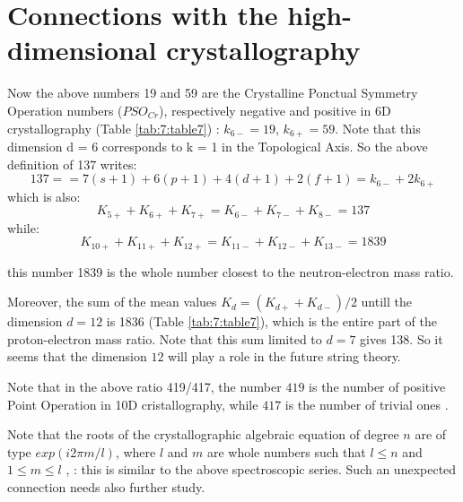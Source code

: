 \documentclass[a4paper,9pt]{article}
\begin{document}
 
 
 
 
 
 
 
 
 \section{Connections with the high-dimensional crystallography}
 
 Now the above numbers 19 and 59 are the Crystalline Ponctual Symmetry Operation numbers ($PSO_{Cr}$), respectively negative and positive in 6D crystallography \cite{Weigel} (Table \ref{tab:7:table7}) : $k_{6-} = 19$, $k_{6+} = 59$. Note that this dimension d = 6 corresponds to k = 1 in the Topological Axis. So the above definition of 137 writes:
  \begin{equation}
   137 =   = 7(s +1) + 6(p +1) + 4(d +1) + 2(f +1) = k_{6-} + 2k_{6+}   
    \end{equation}
    which is also:
    \begin{equation}
    K_{5+}+K_{6+}+K_{7+} = K_{6-} + K_{7-} +K_{8-} = 137   
    \end{equation}
    while:
    \begin{equation}
    K_{10+} +K_{11+}+K_{12+} = K_{11-} +K_{12-}+K_{13-} = 1839   
    \end{equation}
    
    this number 1839 is the whole number closest to the neutron-electron mass ratio.
    
    Moreover, the sum of the mean values $K_{d} = (K_{d+} + K_{d-})/2$ untill the dimension $d = 12$ is 1836 (Table \ref{tab:7:table7}), which is the entire part of the proton-electron mass ratio. Note that this sum limited to $d = 7$ gives 138. So it seems that the dimension $12$ will play a role in the future string theory.
    
    
    Note that in the  above ratio 419/417, the number $419$ is the number of positive Point Operation in 10D cristallography, while $417$ is the number of trivial ones .
    
    
    Note that the roots of the crystallographic algebraic equation of degree $n$ are of type $exp(i2\pi m/l)$, where $l$ and $m$ are whole numbers such that $ l \leq n $ and $ 1 \leq m \leq l $ ,  : this is similar to the above spectroscopic series. Such an unexpected connection needs also further study.   
\end{document}

